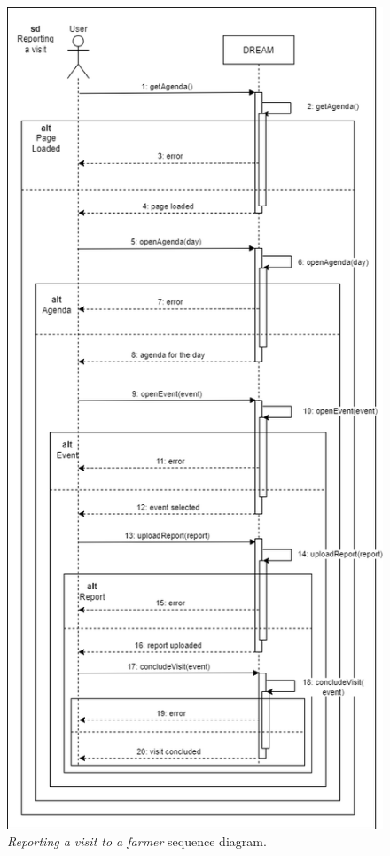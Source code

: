 \begin{figure}[H]
    \centering
    \includegraphics[height=1.5\linewidth]{Images/Use Case/UC16.png}
    \caption{\textit{Reporting a visit to a farmer} sequence diagram.}
\end{figure}
\newpage

